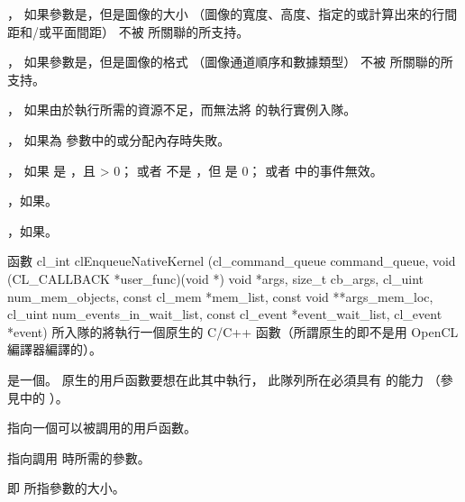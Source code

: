\item {}，
如果參數是，但是圖像的大小
（圖像的寬度、高度、指定的或計算出來的行間距和/或平面間距）
不被  所關聯的所支持。

\item {}，
如果參數是，但是圖像的格式
（圖像通道順序和數據類型）
不被  所關聯的所支持。

\item {}，
如果由於執行所需的資源不足，而無法將  的執行實例入隊。

\item {}，
如果為  參數中的或分配內存時失敗。

\item {}，
  如果  是 ，且  > 0；
  或者  不是 ，但  是 0；
  或者  中的事件無效。

\item {}，如果\scdevfailres。

\item {}，如果\schostfailres。
\stopigBase

函數
\startclc
cl_int clEnqueueNativeKernel (cl_command_queue command_queue,
			void (CL_CALLBACK *user_func)(void *)
			void *args,
			size_t cb_args,
			cl_uint num_mem_objects,
			const cl_mem *mem_list,
			const void **args_mem_loc,
			cl_uint num_events_in_wait_list,
			const cl_event *event_wait_list,
			cl_event *event)
\stopclc
所入隊的將執行一個原生的 C/C++ 函數（所謂原生的即不是用 OpenCL 編譯器編譯的）。

 是一個。
原生的用戶函數要想在此其中執行，
此隊列所在必須具有  的能力
（參見中的 ）。

 指向一個可以被調用的用戶函數。

 指向調用  時所需的參數。

 即  所指參數的大小。

